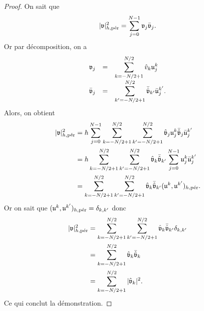 \begin{proof}
On sait que 
\begin{equation}
|\mathfrak{v}|_{h,\per}^2 = \gsum_{j=0}^{N-1} \mathfrak{v}_j \bar{\mathfrak{v}}_j.
\end{equation}
Or par décomposition, on a
\begin{equation}
\begin{array}{rcl}
\mathfrak{v}_j & = & \gsum_{k = -N/2+1}^{N/2} \hat{v}_k \mathfrak{u}_j^k \\
\bar{\mathfrak{v}}_j & = & \gsum_{k' = -N/2+1}^{N/2} \bar{\hat{\mathfrak{v}}}_{k'} \bar{\mathfrak{u}}_j^{k'}.
\end{array}
\end{equation}
Alors, on obtient
\begin{align*}
|\mathfrak{v}|_{h,\per}^2 & = h \gsum_{j=0}^{N-1} \gsum_{k=-N/2+1}^{N/2} \gsum_{k'=-N/2+1}^{N/2} \hat{\mathfrak{v}}_j \mathfrak{u}_j^k \bar{\hat{\mathfrak{v}}}_j \bar{\mathfrak{u}}_j^{k'} \\
	& = h \gsum_{k=-N/2+1}^{N/2} \gsum_{k'=-N/2+1}^{N/2} \hat{\mathfrak{v}}_k \bar{\hat{\mathfrak{v}}}_{k'} \gsum_{j=0}^{N-1} \mathfrak{u}_j^k \bar{\mathfrak{u}}_j^{k'} \\
	& = \gsum_{k=-N/2+1}^{N/2} \gsum_{k'=-N/2+1}^{N/2} \hat{\mathfrak{v}}_k \bar{\hat{\mathfrak{v}}}_{k'} (\mathfrak{u}^k, \mathfrak{u}^{k'})_{h,\per}.
\end{align*}
Or on sait que $(\mathfrak{u}^k, \mathfrak{u}^{k'})_{h,\per} = \delta_{k,k'}$ donc
\begin{align*}
|\mathfrak{v}|_{h,\per}^2 & = \gsum_{k=-N/2+1}^{N/2} \gsum_{k'=-N/2+1}^{N/2} \hat{\mathfrak{v}}_k \bar{\hat{\mathfrak{v}}}_{k'} \delta_{k,k'}\\
	& = \gsum_{k=-N/2+1}^{N/2} \hat{\mathfrak{v}}_k \bar{\hat{\mathfrak{v}}}_k \\
	& = \gsum_{k=-N/2+1}^{N/2} |\hat{\mathfrak{v}}_k|^2.
\end{align*}
Ce qui conclut la démonstration.
\end{proof}

















